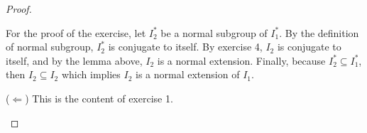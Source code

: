 \begin{proof}
\begin{enumerate}
    For the proof of the exercise, let $I_2^\ast$ be a normal subgroup of $I_1^\ast$. By the definition of normal subgroup, $I_2^\ast$ is conjugate to itself. By exercise 4, $I_2$ is conjugate to itself, and by the lemma above, $I_2$ is a normal extension. Finally, because $I_2^\ast\subseteq I_1^\ast$, then $I_2\subseteq I_2$ which implies $I_2$ is a normal extension of $I_1$.
    
    ($\Leftarrow$) This is the content of exercise 1.
 \end{enumerate}
\end{proof}